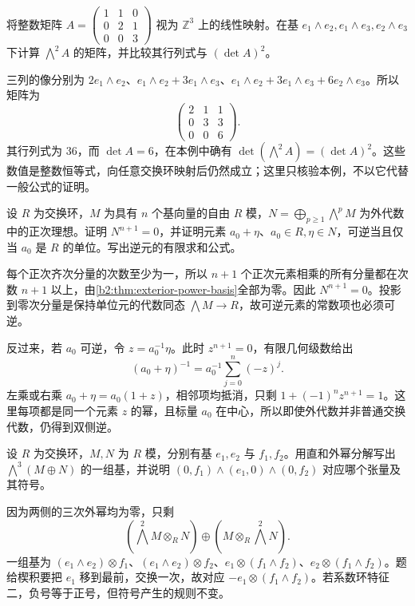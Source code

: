 \begin{exercise}\label{b2:ex:09-exterior-square-map}
	将整数矩阵 \(A=\begin{pmatrix}1&1&0\\0&2&1\\0&0&3\end{pmatrix}\) 视为 \(\mathbb Z^3\) 上的线性映射。在基 \(e_1\wedge e_2,e_1\wedge e_3,e_2\wedge e_3\) 下计算 \(\bigwedge^2 A\) 的矩阵，并比较其行列式与 \((\det A)^2\)。
\end{exercise}
\begin{solution}
	三列的像分别为 \(2e_1\wedge e_2\)、\(e_1\wedge e_2+3e_1\wedge e_3\)、\(e_1\wedge e_2+3e_1\wedge e_3+6e_2\wedge e_3\)。所以矩阵为
	\[
		\begin{pmatrix}2&1&1\\0&3&3\\0&0&6\end{pmatrix}.
	\]
	其行列式为 \(36\)，而 \(\det A=6\)，在本例中确有 \(\det(\bigwedge^2A)=(\det A)^2\)。这些数值是整数恒等式，向任意交换环映射后仍然成立；这里只核验本例，不以它代替一般公式的证明。
\end{solution}

\begin{exercise}\label{b2:ex:09-odd-square}
	设 \(R\) 为交换环，\(M\) 为具有 \(n\) 个基向量的自由 \(R\) 模，\(N=\bigoplus_{p\ge1}\bigwedge^pM\) 为外代数中的正次理想。证明 \(N^{n+1}=0\)，并证明元素 \(a_0+\eta\)、\(a_0\in R,\eta\in N\)，可逆当且仅当 \(a_0\) 是 \(R\) 的单位。写出逆元的有限求和公式。
\end{exercise}
\begin{solution}
	每个正次齐次分量的次数至少为一，所以 \(n+1\) 个正次元素相乘的所有分量都在次数 \(n+1\) 以上，由\cref{b2:thm:exterior-power-basis}全部为零。因此 \(N^{n+1}=0\)。投影到零次分量是保持单位元的代数同态 \(\bigwedge M\to R\)，故可逆元素的常数项也必须可逆。

	反过来，若 \(a_0\) 可逆，令 \(z=a_0^{-1}\eta\)。此时 \(z^{n+1}=0\)，有限几何级数给出
	\[
		(a_0+\eta)^{-1}=a_0^{-1}\sum_{j=0}^n(-z)^j.
	\]
	左乘或右乘 \(a_0+\eta=a_0(1+z)\)，相邻项均抵消，只剩 \(1+(-1)^n z^{n+1}=1\)。这里每项都是同一个元素 \(z\) 的幂，且标量 \(a_0\) 在中心，所以即使外代数并非普通交换代数，仍得到双侧逆。
\end{solution}

\begin{exercise}\label{b2:ex:09-direct-sum-degree-three}
	设 \(R\) 为交换环，\(M,N\) 为 \(R\) 模，分别有基 \(e_1,e_2\) 与 \(f_1,f_2\)。用直和外幂分解写出 \(\bigwedge^3(M\oplus N)\) 的一组基，并说明 \((0,f_1)\wedge(e_1,0)\wedge(0,f_2)\) 对应哪个张量及其符号。
\end{exercise}
\begin{solution}
	因为两侧的三次外幂均为零，只剩
	\[
		\left(\bigwedge^2M\otimes_RN\right) \oplus\left(M\otimes_R\bigwedge^2N\right).
	\]
	一组基为 \((e_1\wedge e_2)\otimes f_1\)、\((e_1\wedge e_2)\otimes f_2\)、\(e_1\otimes(f_1\wedge f_2)\)、\(e_2\otimes(f_1\wedge f_2)\)。题给楔积要把 \(e_1\) 移到最前，交换一次，故对应 \(-e_1\otimes(f_1\wedge f_2)\)。若系数环特征二，负号等于正号，但符号产生的规则不变。
\end{solution}

